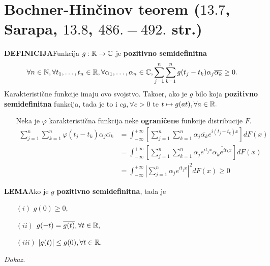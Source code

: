 \documentclass{article}
\begin{document}
\section{Bochner-Hinčinov teorem (\textsection \(13.7\), Sarapa, \textsection \(13.8\), \(486.-492.\) str.)}
\textbf{DEFINICIJA}\newline Funkcija \(g:\Bbb R\to\Bbb C\) je \textbf{pozitivno semidefinitna} \[\forall n\in\Bbb N,\forall t_1,\ldots,t_n\in\Bbb R,\forall\alpha_1,\ldots,\alpha_n\in\Bbb C,\sum_{j=1}^n\sum_{k=1}^ng(t_j-t_k)\alpha_j\overline{\alpha_k}\ge0.\] Karakteristične funkcije imaju ovo svojstvo. Tako\dj{}er, ako je \(g\) bilo koja \textbf{pozitivno semidefinitna} funkcija, tada je to i \(cg,\forall c>0\) te \(t\mapsto g(at),\forall a\in\Bbb R.\) 
\begin{itemize}
    \item[\ding{228}] Neka je \(\varphi\) karakteristična funkcija neke \textbf{ograničene} funkcije distribucije \(F.\) \[\begin{aligned}\sum_{j=1}^n\sum_{k=1}^n\varphi(t_j-t_k)\alpha_j\overline{\alpha_k}&=\int_{-\infty}^{+\infty}\left[\sum_{j=1}^n\sum_{k=1}^n\alpha_j\overline{\alpha_k}e^{i(t_j-t_k)x}\right]dF(x)\\&=\int_{-\infty}^{+\infty}\left[\sum_{j=1}^n\sum_{k=1}^n\alpha_je^{it_jx}\overline{\alpha_ke^{it_kx}}\right]dF(x)\\&=\int_{-\infty}^{+\infty}\left|\sum_{j=1}^n\alpha_je^{it_jx}\right|^2dF(x)\ge 0\end{aligned}\]
\end{itemize}
\textbf{LEMA}\newline Ako je \(g\) \textbf{pozitivno semidefinitna}, tada je 
\begin{enumerate}
    \item[\((i)\)] \(g(0)\ge 0,\)
    \item[\((ii)\)] \(g(-t)=\overline{g(t)},\forall t\in\Bbb R,\)
    \item[\((iii)\)] \(|g(t)|\le g(0),\forall t\in\Bbb R.\)
\end{enumerate}
\textit{Dokaz.}
\end{document}
